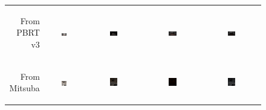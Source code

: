 \begin{figure}[t!bp]
\begin{tabular}{@{}r@{ } c@{ } c@{ } c@{ } c }
		\begin{sideways} \parbox[b]{15mm} {\small{From\\ PBRT v3}} \end{sideways} &
		\includegraphics[width=0.15\textwidth]{figs/4_results/veach-mis/1_from_pbrt_s.png} &
		\includegraphics[width=0.15\textwidth]{figs/4_results/veach-mis/diff_pbrt-mitsuba.png} &
		\includegraphics[width=0.15\textwidth]{figs/4_results/veach-mis/diff_pbrt-lux.png} &
		\includegraphics[width=0.15\textwidth]{figs/4_results/veach-mis/diff_mitsuba-lux.png} \\
		
		\begin{sideways} \parbox[b]{20mm} {\small{From\\ Mitsuba}} \end{sideways} &
		\includegraphics[width=0.15\textwidth]{figs/4_results/lamp/1_from_mitsuba_s.png} &
		\includegraphics[width=0.15\textwidth]{figs/4_results/lamp/diff_mitsuba-pbrt.png} &
		\includegraphics[width=0.15\textwidth]{figs/4_results/lamp/diff_mitsuba-lux.png} &
		\includegraphics[width=0.15\textwidth]{figs/4_results/lamp/diff_pbrt-lux.png} \\
		

\end{tabular}
\end{figure}

